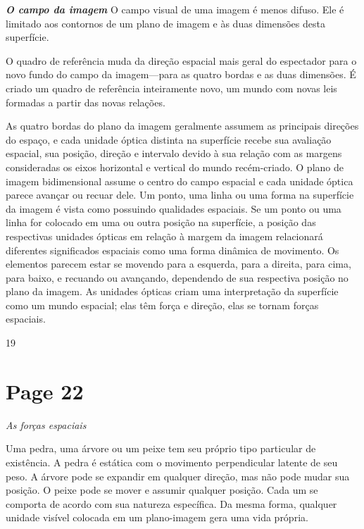 \documentclass[a4paper]{article}
\begin{document}
\textbf{\textit{O campo da imagem}}
O campo visual de uma imagem é menos difuso. Ele é limitado aos contornos de um plano de imagem e às duas dimensões desta superfície.

O quadro de referência muda da direção espacial mais geral do espectador para o novo fundo do campo da imagem---para as quatro bordas e as duas dimensões. É criado um quadro de referência inteiramente novo, um mundo com novas leis formadas a partir das novas relações.

As quatro bordas do plano da imagem geralmente assumem as principais direções do espaço, e cada unidade óptica distinta na superfície recebe sua avaliação espacial, sua posição, direção e intervalo devido à sua relação com as margens consideradas os eixos horizontal e vertical do mundo recém-criado. O plano de imagem bidimensional assume o centro do campo espacial e cada unidade óptica parece avançar ou recuar dele. Um ponto, uma linha ou uma forma na superfície da imagem é vista como possuindo qualidades espaciais. Se um ponto ou uma linha for colocado em uma ou outra posição na superfície, a posição das respectivas unidades ópticas em relação à margem da imagem relacionará diferentes significados espaciais como uma forma dinâmica de movimento. Os elementos parecem estar se movendo para a esquerda, para a direita, para cima, para baixo, e recuando ou avançando, dependendo de sua respectiva posição no plano da imagem. As unidades ópticas criam uma interpretação da superfície como um mundo espacial; elas têm força e direção, elas se tornam forças espaciais.

\vspace*{\fill}
\begin{center}
19
\end{center}

\newpage
\section*{Page 22}

\begin{center}
\itshape As forças espaciais
\end{center}

Uma pedra, uma árvore ou um peixe tem seu próprio tipo particular de existência. A pedra é estática com o movimento perpendicular latente de seu peso. A árvore pode se expandir em qualquer direção, mas não pode mudar sua posição. O peixe pode se mover e assumir qualquer posição. Cada um se comporta de acordo com sua natureza específica. Da mesma forma, qualquer unidade visível colocada em um plano-imagem gera uma vida própria.
\end{document}
